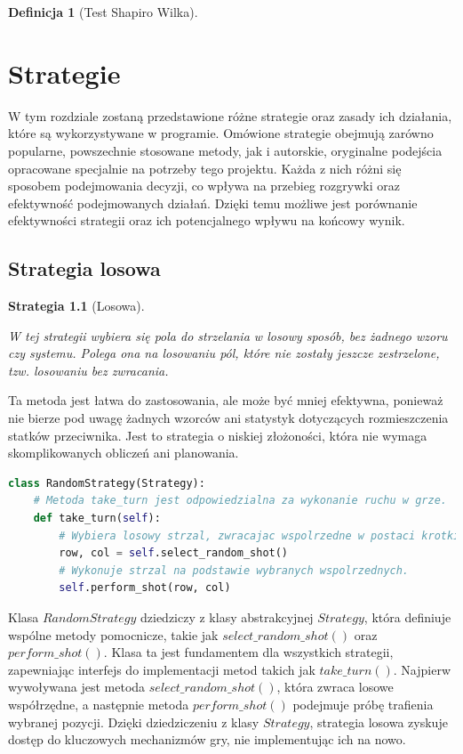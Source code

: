 \documentclass[magisterska]{pracadypl}
\newtheorem{defi}{Definicja}[section]
\newtheorem{strategy}{Strategia}[section]
\begin{document}
\begin{defi}[Test Shapiro Wilka]

\end{defi}

\chapter{Strategie}
W tym rozdziale zostaną przedstawione różne strategie oraz zasady ich działania, które są wykorzystywane w programie. Omówione strategie obejmują zarówno popularne, powszechnie stosowane metody, jak i autorskie, oryginalne podejścia opracowane specjalnie na potrzeby tego projektu. Każda z nich różni się sposobem podejmowania decyzji, co wpływa na przebieg rozgrywki oraz efektywność podejmowanych działań. Dzięki temu możliwe jest porównanie efektywności strategii oraz ich potencjalnego wpływu na końcowy wynik.
\section{Strategia losowa}
\begin{strategy}[Losowa]\cite{yt_1}

W tej strategii wybiera się pola do strzelania w losowy sposób, bez żadnego wzoru czy systemu. 
Polega ona na losowaniu pól, które nie zostały jeszcze zestrzelone, tzw. losowaniu bez zwracania.
\end{strategy}

Ta metoda jest łatwa do zastosowania, ale może być mniej efektywna, 
ponieważ nie bierze pod uwagę żadnych wzorców ani statystyk dotyczących rozmieszczenia statków przeciwnika. 
Jest to strategia o niskiej złożoności, która nie wymaga skomplikowanych obliczeń ani planowania. 

\begin{lstlisting}[language=Python, caption=Kod klasy RandomStrategy]
class RandomStrategy(Strategy):
    # Metoda take_turn jest odpowiedzialna za wykonanie ruchu w grze.
    def take_turn(self):
        # Wybiera losowy strzal, zwracajac wspolrzedne w postaci krotki (wiersz, kolumna).
        row, col = self.select_random_shot()
        # Wykonuje strzal na podstawie wybranych wspolrzednych.
        self.perform_shot(row, col)
\end{lstlisting}
Klasa $RandomStrategy$ dziedziczy z klasy abstrakcyjnej $Strategy$, która definiuje wspólne metody pomocnicze, takie jak $select\_random\_shot()$ oraz $perform\_shot()$. Klasa ta jest fundamentem dla wszystkich strategii, zapewniając interfejs do implementacji metod takich jak $take\_turn()$. Najpierw wywoływana jest metoda $select\_random\_shot()$, która zwraca losowe współrzędne, a następnie metoda $perform\_shot()$ podejmuje próbę trafienia wybranej pozycji. Dzięki dziedziczeniu z klasy $Strategy$, strategia losowa zyskuje dostęp do kluczowych mechanizmów gry, nie implementując ich na nowo.
\end{document}
